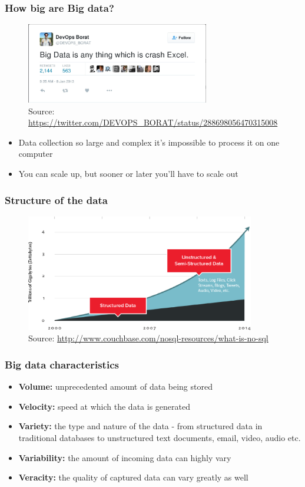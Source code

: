 \documentclass[10pt,utf8]{beamer}
\begin{document}
\begin{frame}
	\frametitle{How big are Big data?}
	 {
		\begin{figure}
			\centering
			\includegraphics[width=8cm]{./img/borat_big_data.eps}
			\caption{\tiny{Source: \url{https://twitter.com/DEVOPS\_BORAT/status/288698056470315008}}}
		\end{figure}
	}
	 {
		\begin{itemize}
			\item Data collection so large and complex it's impossible to process it on one computer
			\item You can scale up, but sooner or later you'll have to scale out
		\end{itemize}
	}
\end{frame}

\begin{frame}
	\frametitle{Structure of the data}
	\begin{figure}
		\centering
		\includegraphics[width=10cm]{./img/why-nosql-2.eps}
		\caption{\tiny{Source: \url{http://www.couchbase.com/nosql-resources/what-is-no-sql}}}
	\end{figure}
\end{frame}


\begin{frame}
	\frametitle{Big data characteristics}
	\begin{itemize}
		\pause
		\item \textbf{Volume:} unprecedented amount of data being stored
		\pause
		\item \textbf{Velocity:} speed at which the data is generated
		\pause
		\item \textbf{Variety:} the type and nature of the data - from structured data in traditional databases to unstructured text documents, email, video, audio etc.
		\pause
		\item \textbf{Variability:} the amount of incoming data can highly vary
		\pause
		\item \textbf{Veracity:} the quality of captured data can vary greatly as well
	\end{itemize}
\end{frame}
\end{document}
